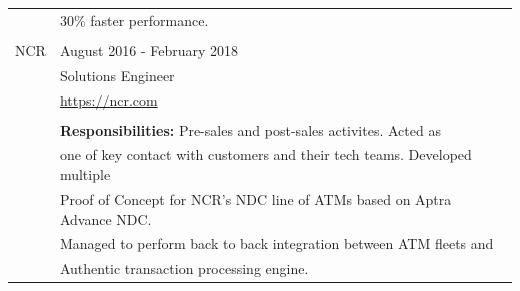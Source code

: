 \documentclass[a4paper]{article}
\begin{document}
\begin{longtable}{@{}r | l}
                   & 30\% faster performance.                                                              \\
                   &                                                                                       \\
    NCR            & August 2016 - February 2018                                                           \\
                   & Solutions Engineer                                                                    \\
                   & \href{https://ncr.com}{https://ncr.com}                                               \\
                   &                                                                                       \\
                   & \textbf{Responsibilities:} Pre-sales and post-sales activites. Acted as               \\
                   & one of key contact with customers and their tech teams. Developed multiple            \\
                   & Proof of Concept for NCR's NDC line of ATMs based on Aptra Advance NDC. \\
                   & Managed to perform back to back integration between ATM fleets and \\
                   & Authentic transaction processing engine.          \\
\end{longtable}
\end{document}
